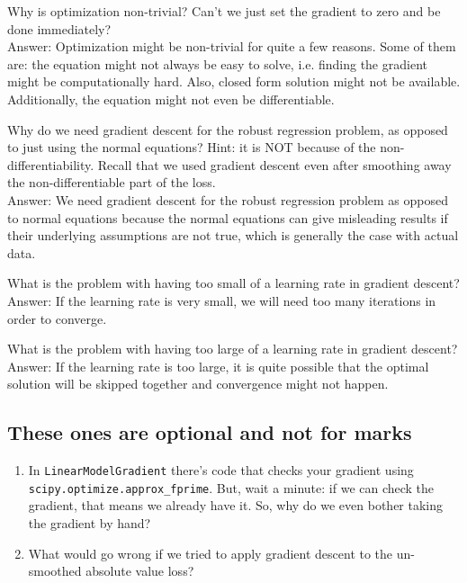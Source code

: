 \documentclass{article}
\def\blu#1{{\color{blu}#1}}
\def\enum#1{\begin{enumerate}#1\end{enumerate}}
\begin{document}
{\item Why is optimization non-trivial? Can't we just set the gradient to zero and be done immediately? \\
\blu{Answer:} Optimization might be non-trivial for quite a few reasons. Some of them are: the equation might not always be easy to solve, i.e. finding the gradient might be computationally hard. Also, closed form solution might not be available. Additionally, the equation might not even be differentiable.
\item Why do we need gradient descent for the robust regression problem, as opposed to just using the normal equations? Hint: it is NOT because of the non-differentiability. Recall that we used gradient descent even after smoothing away the non-differentiable part of the loss. \\
\blu{Answer:} We need gradient descent for the robust regression problem as opposed to normal equations because the normal equations can give misleading results if their underlying assumptions are not true, which is generally the case with actual data.
\item What is the problem with having too small of a learning rate in gradient descent? \\
\blu{Answer:} If the learning rate is very small, we will need too many iterations in order to converge.
\item What is the problem with having too large of a learning rate in gradient descent? \\
\blu{Answer:} If the learning rate is too large, it is quite possible that the optimal solution will be skipped together and convergence might not happen.
}

\subsection{These ones are optional and not for marks}

\enum{
\item In \texttt{LinearModelGradient} there's code that checks your gradient using \texttt{scipy.optimize.approx\_fprime}. But, wait a minute: if we can check the gradient, that means we already have it. So, why do we even bother taking the gradient by hand? 
\item What would go wrong if we tried to apply gradient descent to the un-smoothed absolute value loss?
}
\end{document}
